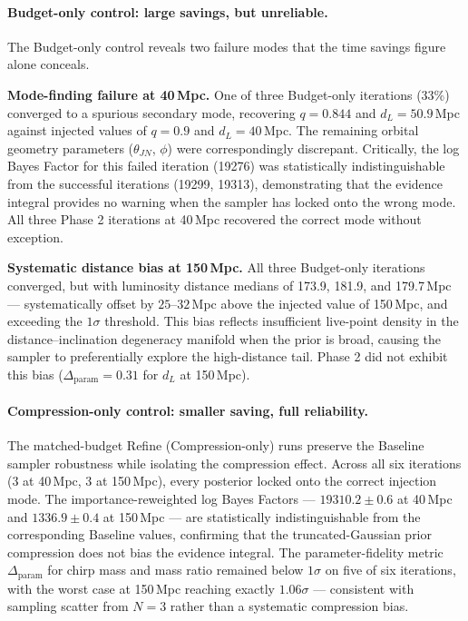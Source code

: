 \documentclass[12pt]{article}
\begin{document}
\paragraph{Budget-only control: large savings, but unreliable.}
The Budget-only control reveals two failure modes that the time savings figure alone conceals.
 
\textbf{Mode-finding failure at 40\,Mpc.} One of three Budget-only iterations (33\%) converged to a spurious secondary mode, recovering $q = 0.844$ and $d_L = 50.9$\,Mpc against injected values of $q = 0.9$ and $d_L = 40$\,Mpc. The remaining orbital geometry parameters ($\theta_{JN}$, $\phi$) were correspondingly discrepant. Critically, the log Bayes Factor for this failed iteration (19276) was statistically indistinguishable from the successful iterations (19299, 19313), demonstrating that the evidence integral provides no warning when the sampler has locked onto the wrong mode. All three Phase 2 iterations at 40\,Mpc recovered the correct mode without exception.
 
\textbf{Systematic distance bias at 150\,Mpc.} All three Budget-only iterations converged, but with luminosity distance medians of 173.9, 181.9, and 179.7\,Mpc --- systematically offset by $25$--$32$\,Mpc above the injected value of 150\,Mpc, and exceeding the $1\sigma$ threshold. This bias reflects insufficient live-point density in the distance--inclination degeneracy manifold when the prior is broad, causing the sampler to preferentially explore the high-distance tail. Phase 2 did not exhibit this bias ($\Delta_{\text{param}} = 0.31$ for $d_L$ at 150\,Mpc).
 
\paragraph{Compression-only control: smaller saving, full reliability.}
The matched-budget Refine (Compression-only) runs preserve the Baseline sampler robustness while isolating the compression effect. Across all six iterations (3 at 40\,Mpc, 3 at 150\,Mpc), every posterior locked onto the correct injection mode. The importance-reweighted log Bayes Factors --- $19310.2 \pm 0.6$ at 40\,Mpc and $1336.9 \pm 0.4$ at 150\,Mpc --- are statistically indistinguishable from the corresponding Baseline values, confirming that the truncated-Gaussian prior compression does not bias the evidence integral. The parameter-fidelity metric $\Delta_{\text{param}}$ for chirp mass and mass ratio remained below $1\sigma$ on five of six iterations, with the worst case at 150\,Mpc reaching exactly $1.06\sigma$ --- consistent with sampling scatter from $N=3$ rather than a systematic compression bias.
 
\end{document}
